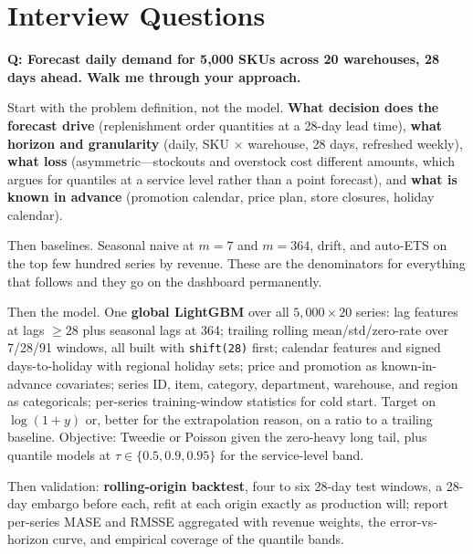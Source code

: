 \section{Interview Questions}
\label{cml:sec:ts_interview}

\begin{interviewq}
\textbf{Q: Forecast daily demand for 5{,}000 SKUs across 20 warehouses, 28 days ahead. Walk me through your approach.}

 \quad {} \quad \badgefreq{\freqhigh}

\stronganswer

Start with the problem definition, not the model. \textbf{What decision does the forecast drive} (replenishment order quantities at a 28-day lead time), \textbf{what horizon and granularity} (daily, SKU $\times$ warehouse, 28 days, refreshed weekly), \textbf{what loss} (asymmetric---stockouts and overstock cost different amounts, which argues for quantiles at a service level rather than a point forecast), and \textbf{what is known in advance} (promotion calendar, price plan, store closures, holiday calendar).

Then baselines. Seasonal naive at $m=7$ and $m=364$, drift, and auto-ETS on the top few hundred series by revenue. These are the denominators for everything that follows and they go on the dashboard permanently.

Then the model. One \textbf{global LightGBM} over all $5{,}000 \times 20$ series: lag features at lags $\ge 28$ plus seasonal lags at 364; trailing rolling mean/std/zero-rate over 7/28/91 windows, all built with \texttt{shift(28)} first; calendar features and signed days-to-holiday with regional holiday sets; price and promotion as known-in-advance covariates; series ID, item, category, department, warehouse, and region as categoricals; per-series training-window statistics for cold start. Target on $\log(1+y)$ or, better for the extrapolation reason, on a ratio to a trailing baseline. Objective: Tweedie or Poisson given the zero-heavy long tail, plus quantile models at $\tau \in \{0.5, 0.9, 0.95\}$ for the service-level band.

Then validation: \textbf{rolling-origin backtest}, four to six 28-day test windows, a 28-day embargo before each, refit at each origin exactly as production will; report per-series MASE and RMSSE aggregated with revenue weights, the error-vs-horizon curve, and empirical coverage of the quantile bands.


\end{interviewq}
